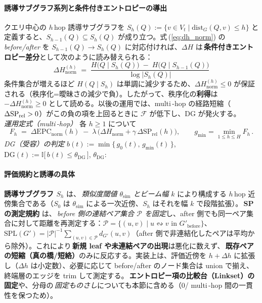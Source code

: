 \documentclass[ja=standard,xelatex]{bxjsarticle}
\newcommand{\F}{\mathcal{F}}
\begin{document}
\paragraph{誘導サブグラフ系列と条件付きエントロピーの導出}
クエリ中心の $h$\,hop 誘導サブグラフを $S_h(Q):=\{v\in V_t\mid \mathrm{dist}_G(Q,v)\le h\}$ と定義すると、$S_{h-1}(Q)\subseteq S_h(Q)$ が成り立つ。式\,(\ref{eq:dh_norm}) の\,\emph{before/after} を $S_{h-1}(Q)\to S_h(Q)$ に対応付ければ、$\Delta H$ は\,\textbf{条件付きエントロピー差分}として次のように読み替えられる：
\begin{equation}
  \boxed{\;\Delta H^{(h)}_{\mathrm{norm}}\;=\;\frac{H\big(Q\mid S_h(Q)\big)\; -\; H\big(Q\mid S_{h-1}(Q)\big)}{\log |S_h(Q)|}\;}\label{eq:cond_dh}
\end{equation}
条件集合が増えるほど $H(Q\mid S_h)$ は単調に減少するため、$\Delta H^{(h)}_{\mathrm{norm}}\le 0$ が保証される（秩序化=曖昧さの減少で負）。したがって、秩序化の\textbf{利得}は $-\Delta H^{(h)}_{\mathrm{norm}}\ge 0$ として読める。以後の運用では、multi\,\mbox{-}hop の経路短縮（$\Delta\mathrm{SP}_{\rm rel}>0$）がこの負の項を上回るときに $\F$ が低下し、DG が発火する。
\\[0.2em]
\textit{運用定式（multi\,\mbox{-}hop）}\; 各 $h\ge1$ について
\begin{equation}
  F_h\;=\;\Delta\mathrm{EPC}_{\mathrm{norm}}(h)\; -\; \lambda\,\Big(\Delta H_{\mathrm{norm}} + \gamma\,\Delta\mathrm{SP}_{\mathrm{rel}}(h)\Big),\qquad
  g_{\min}=\min_{1\le h\le H} F_h\,.
  \label{eq:fh_runtime}
\end{equation}
\noindent \textit{DG（受容）の判定}\; \quad $b(t) := \min\{\, g_0(t),\, g_{\min}(t)\,\}$,\;\; $\mathrm{DG}(t) := \mathbb{I}\big[\, b(t) \le \theta_{\mathrm{DG}}\,\big]$, \;\; $\theta_{\mathrm{DG}}$:\,


\paragraph{評価規約と誘導の具体}
\textbf{誘導サブグラフ $S_h$} は、\,\emph{類似度閾値 $\theta_{\mathrm{sim}}$ とビーム幅 $k$} により構成する $h$\,hop 近傍集合である（$S_0$ は $\theta_{\mathrm{sim}}$ による一次近傍、$S_h$ はそれを幅 $k$ で段階拡張）。\,\textbf{SP の測定規約} は、\,\emph{before 側の連結ペア集合 $\mathcal{P}$ を固定}し、after 側でも同一ペア集合に対して距離を再測定する：$\mathcal{P}{=}\{(u,v)\mid u\leftrightsquigarrow v \text{ in } G'_{\text{before}}\}$、$\mathrm{SPL}(G'){=}|\mathcal{P}|^{-1}\sum_{(u,v)\in\mathcal{P}} d_{G'}(u,v)$（after 側で非連結化したペアは平均から除外）。これにより\,\textbf{新規 leaf や未連結ペアの出現}は悪化に数えず、\,\textbf{既存ペアの短縮（真の橋/短絡）}のみに反応する。実装上は、評価近傍を $h{+}\Delta h$ に拡張し（$\Delta h$ は小定数）、必要に応じて before/after のノード集合は union で揃え、終端層のエッジを trim して測定する。\,\textbf{エントロピー項の比較台（Linkset）の固定}や、分母の\,\emph{固定ものさし}についても本節に含める（0/ multi\,\mbox{-}hop 間の一貫性を保つため）。
\end{document}
